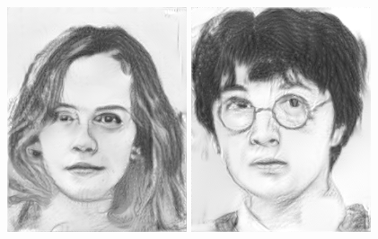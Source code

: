 \documentclass[10pt,twocolumn,letterpaper]{article}
\begin{document}
\begin{figure}[htbp]
{\begin{minipage}[b]{0.22\linewidth}
\includegraphics[width=0.99\linewidth]{img/real_world_photos/ours_r3.png}
\includegraphics[width=0.99\linewidth]{img/real_world_photos/ours_r4.png}

\end{minipage}}
\end{figure}
\end{document}
